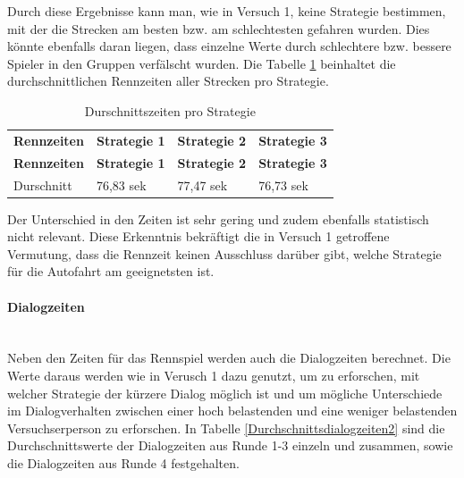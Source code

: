 \documentclass[12pt,a4paper]{scrartcl}
\begin{document}
Durch diese Ergebnisse kann man, wie in Versuch 1, keine Strategie bestimmen, mit der die Strecken am besten bzw. am schlechtesten gefahren wurden.
Dies könnte ebenfalls daran liegen, dass einzelne Werte durch schlechtere bzw. bessere Spieler in den Gruppen verfälscht wurden. Die Tabelle \ref{RennZeitenDis2} beinhaltet die durchschnittlichen Rennzeiten aller Strecken pro Strategie. 

\begin{longtable}{p{3cm}p{3cm}p{3cm}p{3cm} }
	\label{RennZeitenDis2}\\
	\caption[Durschnittszeiten pro Strategie]{Durschnittszeiten pro Strategie}\\
	\hline
	\textbf{Rennzeiten}&\textbf{Strategie 1}&\textbf{Strategie 2} &\textbf{Strategie 3}\\
	\hline
	\endfirsthead
	\hline
	\textbf{Rennzeiten}&\textbf{Strategie 1}&\textbf{Strategie 2} &\textbf{Strategie 3}\\
	\hline
	\endhead
Durschnitt & 76,83 sek & 77,47 sek & 76,73 sek \\
\hline
\end{longtable}
Der Unterschied in den Zeiten ist sehr gering und zudem ebenfalls statistisch nicht relevant. Diese Erkenntnis bekräftigt die in Versuch 1 getroffene Vermutung, dass die Rennzeit keinen Ausschluss darüber gibt, welche Strategie für die Autofahrt am geeignetsten ist. 

\paragraph{Dialogzeiten}
~\\
Neben den Zeiten für das Rennspiel werden auch die Dialogzeiten berechnet. 
Die Werte daraus werden wie in Verusch 1 dazu genutzt, um zu erforschen, mit welcher Strategie der kürzere Dialog möglich ist und um mögliche Unterschiede im Dialogverhalten zwischen einer hoch belastenden und eine weniger belastenden Versuchserperson zu erforschen. 
In Tabelle \ref{Durchschnittsdialogzeiten2} sind die Durchschnittswerte der Dialogzeiten aus Runde 1-3 einzeln und zusammen, sowie die Dialogzeiten aus Runde 4 festgehalten. 
\end{document}
